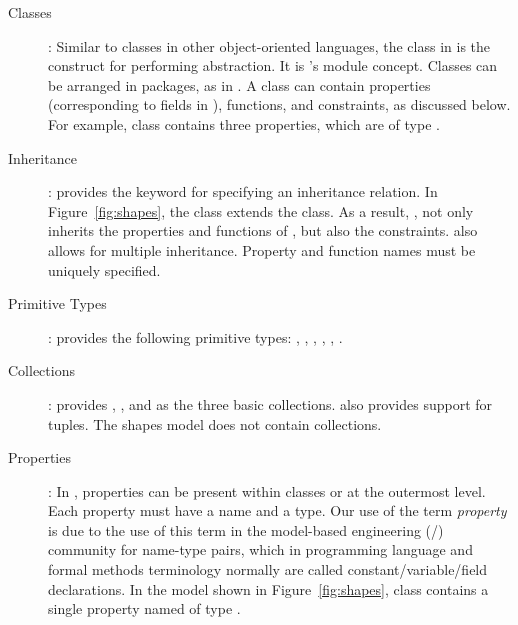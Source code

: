 \begin{description}

\item [Classes]: Similar to classes in other object-oriented 
  languages, the class in
  \Klang{} is the construct for performing abstraction. It is \Klang{}'s
   module concept. Classes can be arranged in packages, as in \java.
   A class can contain properties (corresponding to fields in \java), functions, 
   and constraints, as discussed below. For example, class  
   contains three properties, which are of type .

\item [Inheritance]: \Klang{} provides the  keyword for
  specifying an inheritance relation. In Figure~\ref{fig:shapes},
  the  class extends the  class. As a result,
  , not only inherits the properties and functions of
  , but also the constraints. \Klang{} also allows for
  multiple inheritance. Property and function names must be uniquely
  specified.

\item [Primitive Types]: \Klang{} provides the following primitive
  types: , , , ,
  , .

\item [Collections]: \Klang{} provides , , and
   as the three basic collections. \Klang{} also provides
  support for tuples. The shapes model
  does not contain collections.

\item [Properties]: In \Klang{}, properties can be present within
  classes or at the outermost level. Each property must have a name
  and a type. Our use of the term {\em property} is due to the use of this term
  in the model-based engineering (\uml/\sysml) community for name-type pairs,
  which in programming language and formal methods terminology normally are called
  constant/variable/field declarations.
  In the model shown in Figure~\ref{fig:shapes}, class
   contains a single property named  of type
  .


\end{description}
